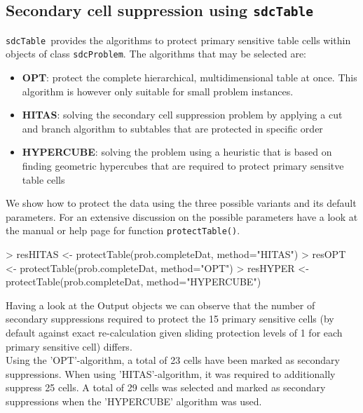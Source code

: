 \documentclass{article}
\newcommand{\sdcTable}{{\tt sdcTable}}
\begin{document}
\subsection{Secondary cell suppression using \sdcTable}\label{ex1:secondSupp}
\sdcTable~provides the algorithms to protect primary sensitive table cells within
objects of class {\tt sdcProblem}. The algorithms that may be selected are:
\begin{itemize}
	\item {\bf OPT}: protect the complete hierarchical, multidimensional table 
	at once. This algorithm is however only suitable for small problem instances.
	\item {\bf HITAS}: solving the secondary cell suppression problem by applying
	a cut and branch algorithm to subtables that are protected in specific order
	\item {\bf HYPERCUBE}: solving the problem using a heuristic that is based on
	finding geometric hypercubes that are required to protect primary sensitve 
	table cells
\end{itemize}

We show how to protect the data using the three possible variants and its default
parameters. For an extensive discussion on the possible parameters have a look
at the manual or help page for function {\tt protectTable()}.

\begin{Sinput}
> resHITAS <- protectTable(prob.completeDat, method="HITAS")
> resOPT <- protectTable(prob.completeDat, method="OPT")
> resHYPER <- protectTable(prob.completeDat, method="HYPERCUBE")
\end{Sinput}

Having a look at the Output objects we can observe that the number of secondary
suppressions required to protect the 15 primary sensitive cells
(by default against exact re-calculation given sliding protection levels of 1 for
each primary sensitive cell) differs. \\

Using the 'OPT'-algorithm, a total of 23
cells have been marked as secondary suppressions. When using 'HITAS'-algorithm, it
was required to additionally suppress  25
cells. A total of  29 cells was 
selected and marked as secondary suppressions when the 'HYPERCUBE' algorithm was
used. \\
\end{document}
